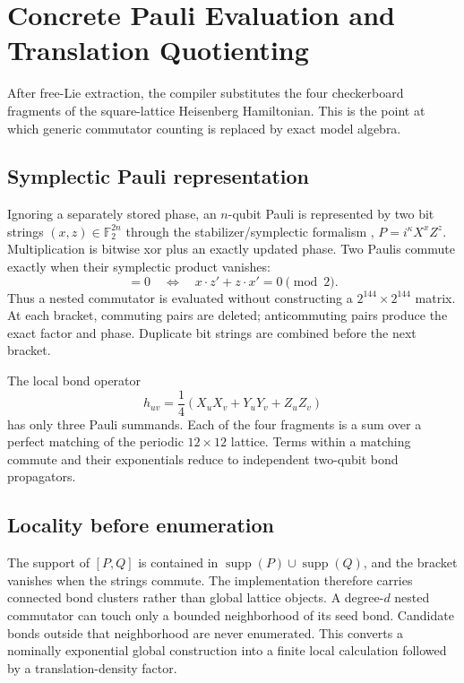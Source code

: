 \section{Concrete Pauli Evaluation and Translation Quotienting}
\label{sec:pauli}

After free-Lie extraction, the compiler substitutes the four checkerboard
fragments of the square-lattice Heisenberg Hamiltonian.  This is the point at
which generic commutator counting is replaced by exact model algebra.

\subsection{Symplectic Pauli representation}

Ignoring a separately stored phase, an $n$-qubit Pauli is represented by two
bit strings $(x,z)\in\mathbb F_2^{2n}$ through the stabilizer/symplectic
formalism \citep{gottesman1997stabilizer},
$P=i^\kappa X^xZ^z$.  Multiplication is bitwise xor plus an exactly updated
phase.  Two Paulis commute exactly when their symplectic product vanishes:
\begin{equation}
  [P(x,z),P(x',z')]=0
  \quad\Longleftrightarrow\quad
  x\!\cdot\!z'+z\!\cdot\!x'=0\pmod 2.
  \label{eq:symplectic-commutation}
\end{equation}
Thus a nested commutator is evaluated without constructing a
$2^{144}\times2^{144}$ matrix.  At each bracket, commuting pairs are deleted;
anticommuting pairs produce the exact factor and phase.  Duplicate bit strings
are combined before the next bracket.

The local bond operator
\begin{equation}
 h_{uv}=\frac14(X_uX_v+Y_uY_v+Z_uZ_v)
 \label{eq:bond-hamiltonian}
\end{equation}
has only three Pauli summands.  Each of the four fragments is a sum over a
perfect matching of the periodic $12\times12$ lattice.  Terms within a
matching commute and their exponentials reduce to independent two-qubit bond
propagators.

\subsection{Locality before enumeration}

The support of $[P,Q]$ is contained in
$\operatorname{supp}(P)\cup\operatorname{supp}(Q)$, and the bracket vanishes
when the strings commute.  The implementation therefore carries connected
bond clusters rather than global lattice objects.  A degree-$d$ nested
commutator can touch only a bounded neighborhood of its seed bond.  Candidate
bonds outside that neighborhood are never enumerated.  This converts a
nominally exponential global construction into a finite local calculation
followed by a translation-density factor.

